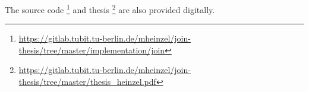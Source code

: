 The source code
\footnote{\url{https://gitlab.tubit.tu-berlin.de/mheinzel/join-thesis/tree/master/implementation/join}}
and thesis
\footnote{\url{https://gitlab.tubit.tu-berlin.de/mheinzel/join-thesis/tree/master/thesis_heinzel.pdf}}
are also provided digitally.

